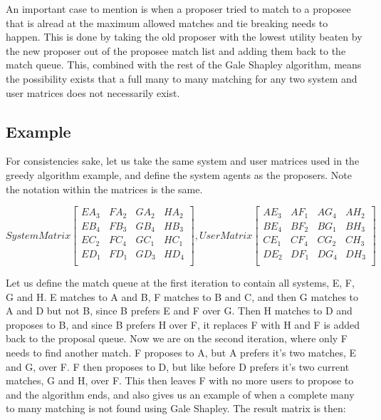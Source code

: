 \documentclass[11pt, letterpaper]{article}
\begin{document}
An important case to mention is when a proposer tried to match to a proposee that is alread at the maximum allowed matches and tie breaking needs to happen.  This is done by taking the old proposer with the lowest utility beaten by the new proposer out of the proposee match list and adding them back to the match queue.  This, combined with the rest of the Gale Shapley algorithm, means the possibility exists that a full many to many matching for any two system and user matrices does not necessarily exist.

	\subsection{Example}
	For consistencies sake, let us take the same system and user matrices used in the greedy algorithm example, and define the system agents as the proposers.  Note the notation within the matrices is the same.

	\[
	System Matrix
	\begin{bmatrix}
		EA_{3} & FA_{2} & GA_{2} & HA_{2} \\
		EB_{4} & FB_{3} & GB_{4} & HB_{3} \\
		EC_{2} & FC_{4} & GC_{1} & HC_{1} \\
		ED_{1} & FD_{1} & GD_{3} & HD_{4} \\
	\end{bmatrix}
	, User Matrix
	\begin{bmatrix}
		AE_{3} & AF_{1} & AG_{4} & AH_{2} \\
		BE_{4} & BF_{2} & BG_{1} & BH_{3} \\
		CE_{1} & CF_{4} & CG_{2} & CH_{3} \\
		DE_{2} & DF_{1} & DG_{4} & DH_{3} \\
	\end{bmatrix}
	\]

	Let us define the match queue at the first iteration to contain all systems, E, F, G and H.  E matches to A and B, F matches to B and C, and then G matches to A and D but not B, since B prefers E and F over G.  Then H matches to D and proposes to B, and since B prefers H over F, it replaces F with H and F is added back to the proposal queue.  Now we are on the second iteration, where only F needs to find another match.  F proposes to A, but A prefers it's two matches, E and G, over F.  F then proposes to D, but like before D prefers it's two current matches, G and H, over F.  This then leaves F with no more users to propose to and the algorithm ends, and also gives us an example of when a complete many to many matching is not found using Gale Shapley.  The result matrix is then:
\end{document}
